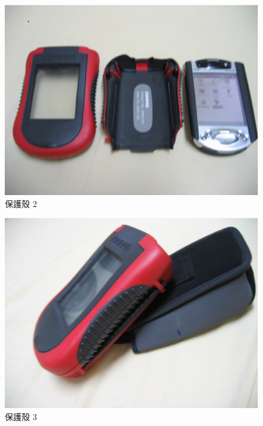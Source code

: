 \documentclass[12pt,a4paper]{article}
\begin{document}
\begin{CJK}{UTF8}{cwmu}
\begin{figure}[htbp]
\centering
\includegraphics[scale=0.4]{eps/shell_2.eps}
\caption{保護殼 2}
\end{figure}

\begin{figure}[htbp]
\centering
\includegraphics[scale=0.3]{eps/shell_5.eps}
\caption{保護殼 3}
\end{figure}


\end{CJK}
\end{document}
